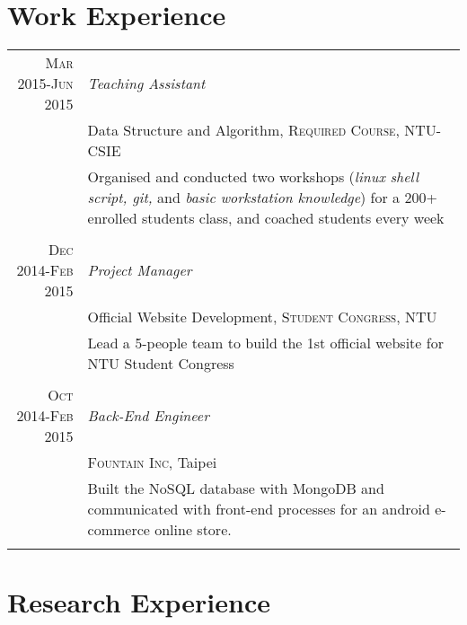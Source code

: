 \documentclass[a4paper,11pt]{article} %
\begin{document}

\section{Work Experience}

\begin{tabular}{r|p{11cm}}

\textsc{Mar 2015-Jun 2015} & \emph{Teaching Assistant}\\
& Data Structure and Algorithm, \textsc{Required Course}, NTU-CSIE \\ 
& \footnotesize{Organised and conducted two workshops (\textit{linux shell script, git,} and \textit{basic workstation knowledge}) for a 200+ enrolled students class, and coached students every week}\\
\multicolumn{2}{c}{} \\

\textsc{Dec 2014-Feb 2015} & \emph{Project Manager}\\
& Official Website Development, \textsc{Student Congress}, NTU \emph{}\\
& \footnotesize{Lead a 5-people team to build the 1st official website for NTU Student Congress}\\
\multicolumn{2}{c}{} \\

\textsc{Oct 2014-Feb 2015} & \emph{Back-End Engineer}\\ 
& \textsc{Fountain Inc}, Taipei \emph{}\\
& \footnotesize{Built the NoSQL database with MongoDB and communicated with front-end processes for an android e-commerce online store.}\\
\multicolumn{2}{c}{} \\

\end{tabular}

\section{Research Experience}
\end{document}
